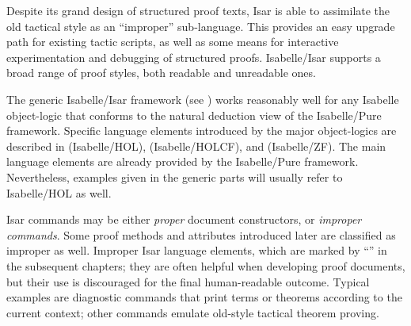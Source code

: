 \begin{isabellebody}
\begin{isamarkuptext}
  Despite its grand design of structured proof texts, Isar is able to
  assimilate the old tactical style as an ``improper'' sub-language.
  This provides an easy upgrade path for existing tactic scripts, as
  well as some means for interactive experimentation and debugging of
  structured proofs.  Isabelle/Isar supports a broad range of proof
  styles, both readable and unreadable ones.

  \medskip The generic Isabelle/Isar framework (see
  ) works reasonably well for any Isabelle
  object-logic that conforms to the natural deduction view of the
  Isabelle/Pure framework.  Specific language elements introduced by
  the major object-logics are described in 
  (Isabelle/HOL),  (Isabelle/HOLCF), and 
  (Isabelle/ZF).  The main language elements are already provided by
  the Isabelle/Pure framework. Nevertheless, examples given in the
  generic parts will usually refer to Isabelle/HOL as well.

  \medskip Isar commands may be either \emph{proper} document
  constructors, or \emph{improper commands}.  Some proof methods and
  attributes introduced later are classified as improper as well.
  Improper Isar language elements, which are marked by ``\isa{{\isachardoublequote}\isactrlsup {\isacharasterisk}{\isachardoublequote}}'' in the subsequent chapters; they are often helpful
  when developing proof documents, but their use is discouraged for
  the final human-readable outcome.  Typical examples are diagnostic
  commands that print terms or theorems according to the current
  context; other commands emulate old-style tactical theorem proving.%
\end{isamarkuptext}%
\isamarkuptrue%
%
\isadelimtheory
%
\endisadelimtheory
%
\isatagtheory
{}\isamarkupfalse%
%
\endisatagtheory
{\isafoldtheory}%
%
\isadelimtheory
%
\endisadelimtheory
\isanewline
\end{isabellebody}%
